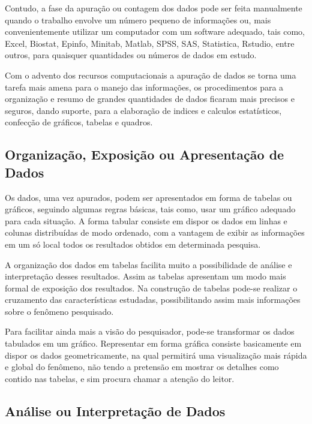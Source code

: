 Contudo, a fase da apuração ou contagem dos dados pode ser feita manualmente quando o trabalho envolve um número pequeno de
informações ou, mais convenientemente utilizar um computador com
um software adequado, tais como, Excel, Biostat, Epinfo, Minitab, Matlab,
SPSS, SAS, Statistica, Rstudio, entre outros, para quaisquer quantidades ou números de
dados em estudo.\vskip0.3cm
 


Com o advento dos recursos computacionais a
apuração de dados se torna uma tarefa mais amena para o manejo das
informações, os procedimentos para a organização e resumo de
grandes quantidades de dados ficaram mais precisos e seguros,
dando suporte, para a elaboração de indices e calculos
estatísticos, confecção de gráficos, tabelas e quadros.



\subsection{Organização, Exposição ou Apresentação de Dados}

Os dados, uma vez apurados, podem ser apresentados em forma
de tabelas ou gráficos, seguindo algumas regras básicas,
tais como, usar um gráfico adequado para cada situação. A forma
tabular consiste em dispor os dados em linhas e colunas
distribuídas de modo ordenado, com a vantagem de exibir as
informações em um só local todos os resultados obtidos em
determinada pesquisa. 


A organização dos dados em tabelas facilita
muito a possibilidade de análise e interpretação desses
resultados. Assim as tabelas apresentam um modo mais formal de
exposição dos resultados. Na construção de tabelas pode-se
realizar o cruzamento das características estudadas,
possibilitando assim mais informações sobre o fenômeno
pesquisado.\vskip0.3cm

Para facilitar ainda mais a visão do
pesquisador, pode-se transformar os dados
tabulados em um gráfico. Representar em forma
gráfica consiste basicamente em dispor os dados
geometricamente, na qual permitirá uma visualização
mais rápida e global do fenômeno, não tendo a pretensão
em mostrar os detalhes como contido nas tabelas, e sim
procura chamar a atenção do leitor.\vskip0.3cm


\subsection{Análise ou Interpretação de Dados}

